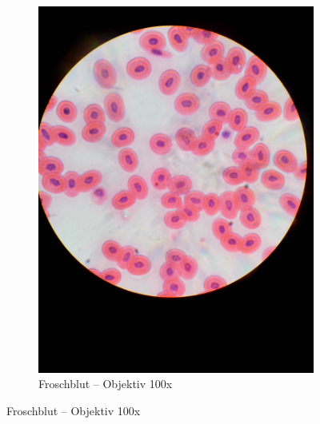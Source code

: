 \begin{figure}[h!]
\begin{subfigure}[b]{0.3\textwidth}
		\includegraphics[width=1\textwidth]{../images/01_frog_blood.jpg}
		\caption{Froschblut -- Objektiv 100x}
	\end{subfigure}


\end{figure}
